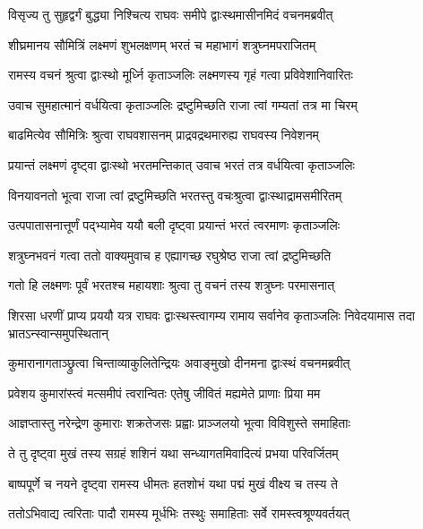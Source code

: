 
\twolineshloka
{विसृज्य तु सुहृद्वर्गं बुद्ध्या निश्चित्य राघवः}
{समीपे द्वाःस्थमासीनमिदं वचनमब्रवीत्} %

\twolineshloka
{शीघ्रमानय सौमित्रिं लक्ष्मणं शुभलक्षणम्}
{भरतं च महाभागं शत्रुघ्नमपराजितम्} %

\twolineshloka
{रामस्य वचनं श्रुत्वा द्वाःस्थो मूर्ध्नि कृताञ्जलिः}
{लक्ष्मणस्य गृहं गत्वा प्रविवेशानिवारितः} %

\twolineshloka
{उवाच सुमहात्मानं वर्धयित्वा कृताञ्जलिः}
{द्रष्टुमिच्छति राजा त्वां गम्यतां तत्र मा चिरम्} %

\twolineshloka
{बाढमित्येव सौमित्रिः श्रुत्वा राघवशासनम्}
{प्राद्रवद्रथमारुह्य राघवस्य निवेशनम्} %

\twolineshloka
{प्रयान्तं लक्ष्मणं दृष्ट्वा द्वाःस्थो भरतमन्तिकात्}
{उवाच भरतं तत्र वर्धयित्वा कृताञ्जलिः} %

\twolineshloka
{विनयावनतो भूत्वा राजा त्वां द्रष्टुमिच्छति}
{भरतस्तु वचःश्रुत्वा द्वाःस्थाद्रामसमीरितम्} %

\twolineshloka
{उत्पपातासनात्तूर्णं पद्भ्यामेव ययौ बली}
{दृष्ट्वा प्रयान्तं भरतं त्वरमाणः कृताञ्जलिः} %

\twolineshloka
{शत्रुघ्नभवनं गत्वा ततो वाक्यमुवाच ह}
{एह्यागच्छ रघुश्रेष्ठ राजा त्वां द्रष्टुमिच्छति} %

\twolineshloka
{गतो हि लक्ष्मणः पूर्वं भरतश्च महायशाः}
{श्रुत्वा तु वचनं तस्य शत्रुघ्नः परमासनात्} %

\threelineshloka
{शिरसा धरणीं प्राप्य प्रययौ यत्र राघवः}
{द्वाःस्थस्त्वागम्य रामाय सर्वानेव कृताञ्जलिः}
{निवेदयामास तदा भ्रातऽन्स्वान्समुपस्थितान्} %

\twolineshloka
{कुमारानागताञ्छ्रुत्वा चिन्ताव्याकुलितेन्द्रियः}
{अवाङ्मुखो दीनमना द्वाःस्थं वचनमब्रवीत्} %

\twolineshloka
{प्रवेशय कुमारांस्त्वं मत्समीपं त्वरान्वितः}
{एतेषु जीवितं मह्यमेते प्राणाः प्रिया मम} %

\twolineshloka
{आज्ञप्तास्तु नरेन्द्रेण कुमाराः शक्रतेजसः}
{प्रह्वाः प्राञ्जलयो भूत्वा विविशुस्ते समाहिताः} %

\twolineshloka
{ते तु दृष्ट्वा मुखं तस्य सग्रहं शशिनं यथा}
{सन्ध्यागतमिवादित्यं प्रभया परिवर्जितम्} %

\twolineshloka
{बाष्पपूर्णे च नयने दृष्ट्वा रामस्य धीमतः}
{हतशोभं यथा पद्मं मुखं वीक्ष्य च तस्य ते} %

\twolineshloka
{ततोऽभिवाद्य त्वरिताः पादौ रामस्य मूर्धभिः}
{तस्थुः समाहिताः सर्वे रामस्त्वश्रूण्यवर्तयत्} %

